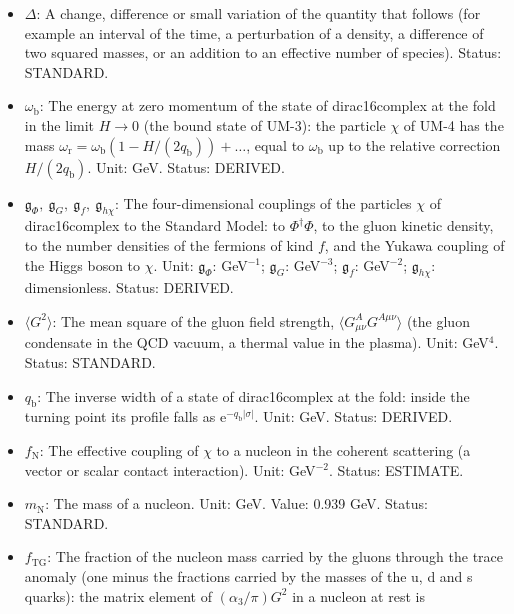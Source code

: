 \documentclass[
  10pt,
]{article}
\providecommand{\tightlist}{%
  \setlength{\itemsep}{0pt}\setlength{\parskip}{0pt}}
\begin{document}
\begin{itemize}
\tightlist
\item
  \(\Delta\): A change, difference or small variation of the quantity
  that follows (for example an interval of the time, a perturbation of a
  density, a difference of two squared masses, or an addition to an
  effective number of species). Status: STANDARD.
\item
  \(\omega_{\mathrm{b}}\): The energy at zero momentum of the state of
  dirac16complex at the fold in the limit \(H \to 0\) (the bound state
  of UM-3): the particle \(\chi\) of UM-4 has the mass
  \(\omega_{\mathrm{r}} = \omega_{\mathrm{b}}(1 - H/(2q_{\mathrm{b}})) + \dots\),
  equal to \(\omega_{\mathrm{b}}\) up to the relative correction
  \(H/(2q_{\mathrm{b}})\). Unit: GeV. Status: DERIVED.
\item
  \(\mathfrak{g}_{\Phi},\ \mathfrak{g}_{G},\ \mathfrak{g}_{f},\ \mathfrak{g}_{h\chi}\):
  The four-dimensional couplings of the particles \(\chi\) of
  dirac16complex to the Standard Model: to \(\Phi^\dagger\Phi\), to the
  gluon kinetic density, to the number densities of the fermions of kind
  \(f\), and the Yukawa coupling of the Higgs boson to \(\chi\). Unit:
  \(\mathfrak{g}_{\Phi}\): GeV\(^{-1}\); \(\mathfrak{g}_{G}\):
  GeV\(^{-3}\); \(\mathfrak{g}_{f}\): GeV\(^{-2}\);
  \(\mathfrak{g}_{h\chi}\): dimensionless. Status: DERIVED.
\item
  \(\langle G^2\rangle\): The mean square of the gluon field strength,
  \(\langle G^A_{\mu\nu}G^{A\mu\nu}\rangle\) (the gluon condensate in
  the QCD vacuum, a thermal value in the plasma). Unit: GeV\(^4\).
  Status: STANDARD.
\item
  \(q_{\mathrm{b}}\): The inverse width of a state of dirac16complex at
  the fold: inside the turning point its profile falls as
  \(\mathrm{e}^{-q_{\mathrm{b}}\lvert\sigma\rvert}\). Unit: GeV. Status:
  DERIVED.
\item
  \(f_{\mathrm{N}}\): The effective coupling of \(\chi\) to a nucleon in
  the coherent scattering (a vector or scalar contact interaction).
  Unit: GeV\(^{-2}\). Status: ESTIMATE.
\item
  \(m_{\mathrm{N}}\): The mass of a nucleon. Unit: GeV. Value: 0.939
  GeV. Status: STANDARD.
\item
  \(f_{\mathrm{TG}}\): The fraction of the nucleon mass carried by the
  gluons through the trace anomaly (one minus the fractions carried by
  the masses of the u, d and s quarks): the matrix element of
  \((\alpha_3/\pi)G^2\) in a nucleon at rest is

\end{itemize}
\end{document}
